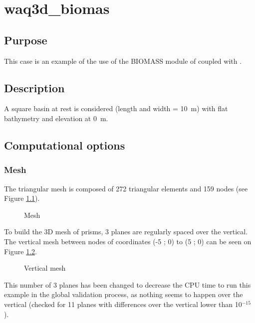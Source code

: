 \chapter{waq3d\_biomas}

\section{Purpose}

This case is an example of the use of the BIOMASS module of \waqtel coupled with
.

\section{Description}

A square basin at rest is considered (length and width = 10~m)
with flat bathymetry and elevation at 0~m.

\section{Computational options}

\subsection{Mesh}

The triangular mesh is composed of 272 triangular elements and 159 nodes
(see Figure \ref{fig:waq3d_biomas:mesh}).

\begin{figure}[H]
 \centering
\caption{Mesh}
 \label{fig:waq3d_biomas:mesh}
\end{figure}

To build the 3D mesh of prisms, 3 planes are regularly spaced over the vertical.
The vertical mesh between nodes of coordinates (-5 ; 0) to (5 ; 0) can be
seen on Figure \ref{fig:waq3d_biomas:mesh_section}.

\begin{figure}[H]
 \centering
\caption{Vertical mesh}
 \label{fig:waq3d_biomas:mesh_section}
\end{figure}

This number of 3 planes has been changed to decrease the CPU time to run this
example in the global validation process,
as nothing seems to happen over the vertical
(checked for 11 planes with differences over the vertical lower than
10$^{-15}$).

